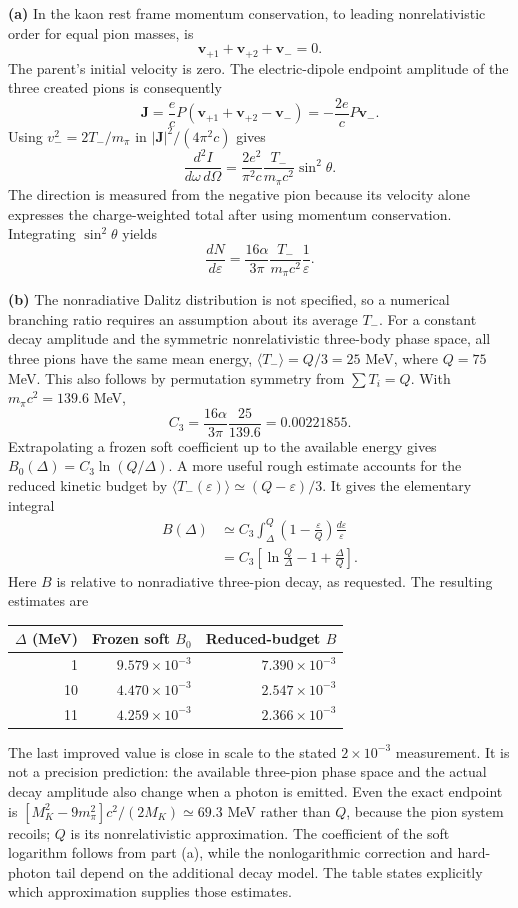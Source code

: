 \medskip\noindent\textbf{(a)} In the kaon rest frame momentum
conservation, to leading nonrelativistic order for equal pion masses,
is
\[
\mathbf v_{+1}+\mathbf v_{+2}+\mathbf v_-=0.
\]
The parent's initial velocity is zero.  The electric-dipole endpoint
amplitude of the three created pions is consequently
\[
\mathbf J=\frac ecP(\mathbf v_{+1}+\mathbf v_{+2}-\mathbf v_-)
=-\frac{2e}{c}P\mathbf v_-.
\]
Using $v_-^2=2T_-/m_\pi$ in $|\mathbf J|^2/(4\pi^2c)$ gives
\[
\boxed{\frac{d^2I}{d\omega\,d\Omega}
=\frac{2e^2}{\pi^2c}\frac{T_-}{m_\pi c^2}\sin^2\theta.}
\]
The direction is measured from the negative pion because its velocity
alone expresses the charge-weighted total after using momentum
conservation.  Integrating $\sin^2\theta$ yields
\[
\frac{dN}{d\varepsilon}
=\frac{16\alpha}{3\pi}\frac{T_-}{m_\pi c^2}
 \frac1\varepsilon.
\]

\medskip\noindent\textbf{(b)} The nonradiative Dalitz distribution
is not specified, so a numerical branching ratio requires an
assumption about its average $T_-$.  For a constant decay amplitude
and the symmetric nonrelativistic three-body phase space, all three
pions have the same mean energy, $\langle T_-\rangle=Q/3=25$ MeV,
where $Q=75$ MeV.  This also follows by permutation symmetry from
$\sum T_i=Q$.  With $m_\pi c^2=139.6$ MeV,
\[
C_3=\frac{16\alpha}{3\pi}\frac{25}{139.6}=0.00221855.
\]
Extrapolating a frozen soft coefficient up to the available energy
gives $B_0(\Delta)=C_3\ln(Q/\Delta)$.
A more useful rough estimate accounts for the reduced kinetic
budget by $\langle T_-(\varepsilon)\rangle\simeq(Q-\varepsilon)/3$.
It gives the elementary integral
\begin{align*}
B(\Delta)&\simeq C_3\int_\Delta^Q
 \left(1-\frac{\varepsilon}{Q}\right)\frac{d\varepsilon}{\varepsilon}\\
&=\boxed{C_3\left[\ln\frac Q\Delta-1+\frac\Delta Q\right].}
\end{align*}
Here $B$ is relative to nonradiative three-pion decay, as requested.
The resulting estimates are
\begin{center}
\begin{tabular}{rrr}
\toprule
$\Delta$ (MeV)&Frozen soft $B_0$&Reduced-budget $B$\\
\midrule
1&$9.579\times10^{-3}$&$7.390\times10^{-3}$\\
10&$4.470\times10^{-3}$&$2.547\times10^{-3}$\\
11&$4.259\times10^{-3}$&$2.366\times10^{-3}$\\
\bottomrule
\end{tabular}
\end{center}
The last improved value is close in scale to the stated
$2\times10^{-3}$ measurement.  It is not a precision prediction:
the available three-pion phase space and the actual decay amplitude
also change when a photon is emitted.  Even the exact endpoint is
$[M_K^2-9m_\pi^2]c^2/(2M_K)\simeq69.3$ MeV rather than $Q$,
because the pion system recoils; $Q$ is its nonrelativistic
approximation.  The coefficient of the soft logarithm follows from
part (a), while the nonlogarithmic correction and hard-photon tail
depend on the additional decay model.  The table states explicitly
which approximation supplies those estimates.


